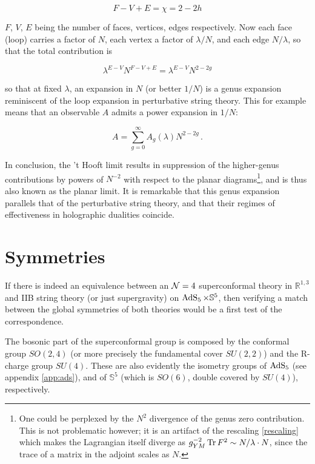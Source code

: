 \begin{equation}
F - V + E = \chi = 2 - 2h 
\end{equation}

$F$, $V$, $E$ being the number of faces, vertices, edges respectively. Now each face (loop) carries a factor of $N$, each vertex a factor of $\lambda/N$, and each edge $N/\lambda$, so that the total contribution is

\begin{equation}
\lambda^{E-V} N^{F-V+E} = \lambda^{E-V} N^{2-2g} 
\end{equation}

so that at fixed $\lambda$, an expansion in $N$ (or better $1/N$) is a genus expansion reminiscent of the loop expansion in perturbative string theory. This for example means that an observable $A$ admits a power expansion in $1/N$:

\begin{equation}
	A = \sum_{g=0}^\infty A_g(\lambda) N^{2-2g}\,.
\end{equation}

In conclusion, the 't Hooft limit results in suppression of the higher-genus contributions by powers of $N^{-2}$ with respect to the planar diagrams\footnote{One could be perplexed by the $N^2$ divergence of the genus zero contribution. This is not problematic however; it is an artifact of the rescaling \ref{rescaling} which makes the Lagrangian itself diverge as $g_{YM}^{-2} \operatorname{Tr} F^2 \sim N/\lambda \cdot N$, since the trace of a matrix in the adjoint scales as $N$.}, and is thus also known as the planar limit. It is remarkable that this genus expansion parallels that of the perturbative string theory, and that their regimes of effectiveness in holographic dualities coincide.

\section{Symmetries}

If there is indeed an equivalence between an $\mathcal{N} = 4$ superconformal theory in $\mathbb{R}^{1,3}$ and IIB string theory (or just supergravity) on $\operatorname{AdS}_{5}\times\mathbb{S}^5$, then verifying a match between the global symmetries of both theories would be a first test of the correspondence.

The bosonic part of the superconformal group is composed by the conformal group $SO(2,4)$ (or more precisely the fundamental cover $SU(2,2)$) and the R-charge group $SU(4)$. These are also evidently the isometry groups of $\operatorname{AdS}_{5}$ (see appendix \ref{app:ads}), and of $\mathbb{S}^5$ (which is $SO(6)$, double covered by $SU(4)$), respectively.

